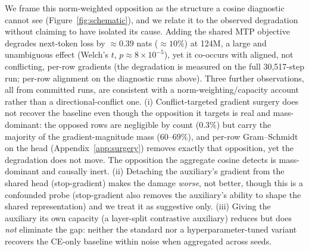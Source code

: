 \documentclass{article}
\begin{document}
We frame this norm-weighted opposition as the structure a cosine diagnostic
cannot see (Figure~\ref{fig:schematic}), and we relate it to the observed
degradation without claiming to have isolated its cause. Adding the shared MTP objective degrades next-token loss by
${\approx}0.39$ nats (${\approx}10\%$) at 124M, a large and unambiguous effect
(Welch's $t$, $p\approx 8\times10^{-5}$), yet it co-occurs with aligned, not
conflicting, per-row gradients (the degradation is measured on the full
30{,}517-step run; per-row alignment on the diagnostic runs above). Three further
observations, all from committed
runs, are consistent with a norm-weighting/capacity account rather than a
directional-conflict one. (i) Conflict-targeted gradient surgery does not recover
the baseline even though the opposition it targets is real and mass-dominant: the
opposed rows are negligible by count ($0.3\%$) but carry the majority of the
gradient-magnitude mass ($60$--$69\%$), and per-row Gram--Schmidt on the head
(Appendix~\ref{app:surgery}) removes exactly that opposition, yet the degradation
does not move. The opposition the aggregate cosine detects is mass-dominant and
causally inert. (ii) Detaching the auxiliary's gradient from
the shared head (stop-gradient) makes the damage \emph{worse}, not better, though
this is a confounded probe (stop-gradient also removes the auxiliary's ability to
shape the shared representation) and we treat it as suggestive only. (iii)
Giving the auxiliary its own capacity (a layer-split contrastive auxiliary)
reduces but does \emph{not} eliminate the gap: neither the standard nor a
hyperparameter-tuned variant recovers the CE-only baseline within noise when
aggregated across seeds.
\end{document}
